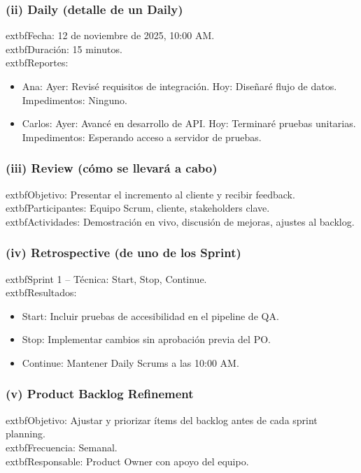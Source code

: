 \subsubsection{(ii) Daily (detalle de un Daily)}
	extbf{Fecha:} 12 de noviembre de 2025, 10:00 AM.\\
	extbf{Duración:} 15 minutos.\\
	extbf{Reportes:}
\begin{itemize}
  \item Ana: Ayer: Revisé requisitos de integración. Hoy: Diseñaré flujo de datos. Impedimentos: Ninguno.
  \item Carlos: Ayer: Avancé en desarrollo de API. Hoy: Terminaré pruebas unitarias. Impedimentos: Esperando acceso a servidor de pruebas.
\end{itemize}

\subsubsection{(iii) Review (cómo se llevará a cabo)}
	extbf{Objetivo:} Presentar el incremento al cliente y recibir feedback.\\
	extbf{Participantes:} Equipo Scrum, cliente, stakeholders clave.\\
	extbf{Actividades:} Demostración en vivo, discusión de mejoras, ajustes al backlog.

\subsubsection{(iv) Retrospective (de uno de los Sprint)}
	extbf{Sprint 1 – Técnica:} Start, Stop, Continue.\\
	extbf{Resultados:}
\begin{itemize}
  \item Start: Incluir pruebas de accesibilidad en el pipeline de QA.
  \item Stop: Implementar cambios sin aprobación previa del PO.
  \item Continue: Mantener Daily Scrums a las 10:00 AM.
\end{itemize}

\subsubsection{(v) Product Backlog Refinement}
	extbf{Objetivo:} Ajustar y priorizar ítems del backlog antes de cada sprint planning.\\
	extbf{Frecuencia:} Semanal.\\
	extbf{Responsable:} Product Owner con apoyo del equipo.

